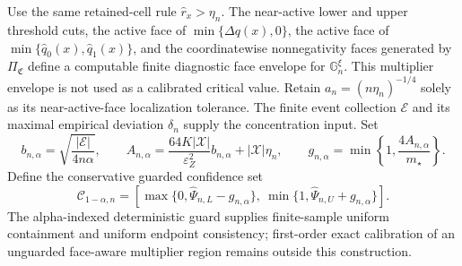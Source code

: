 Use the same retained-cell rule \(\widehat r_x>\eta_n\).  The near-active lower and upper threshold cuts, the active face of \(\min\{\widehat{\Delta q}(x),0\}\), the active face of \(\min\{\widehat q_0(x),\widehat q_1(x)\}\), and the coordinatewise nonnegativity faces generated by \(\Pi_{\mathfrak C}\) define a computable finite diagnostic face envelope for \(\mathbb G_n^\xi\).  This multiplier envelope is not used as a calibrated critical value.  Retain \(a_n=(n\eta_n)^{-1/4}\) solely as its near-active-face localization tolerance.  The finite event collection \(\mathcal E\) and its maximal empirical deviation \(\delta_n\) supply the concentration input.  Set
\[
b_{n,\alpha}=\sqrt{\frac{|\mathcal E|}{4n\alpha}},\qquad
A_{n,\alpha}=\frac{64K|\mathcal X|}{\varepsilon_Z^2}b_{n,\alpha}+|\mathcal X|\eta_n,
\qquad
g_{n,\alpha}=\min\left\{1,\frac{4A_{n,\alpha}}{m_{\star}}\right\}.
\]
Define the conservative guarded confidence set
\[
\mathcal C_{1-\alpha,n}=
\left[\max\{0,\widehat\Psi_{n,L}-g_{n,\alpha}\},\
\min\{1,\widehat\Psi_{n,U}+g_{n,\alpha}\}\right].
\]
The alpha-indexed deterministic guard supplies finite-sample uniform containment and uniform endpoint consistency; first-order exact calibration of an unguarded face-aware multiplier region remains outside this construction.